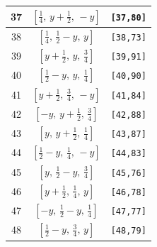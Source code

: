 \documentclass[fleqn,8pt]{jsarticle}
\begin{document}
\begin{longtable}{ccc}
37 & $\left[ \frac{1}{4},\, y + \frac{1}{2},\, - y \right]$ & {\tt [37,80]} \\ \hline
38 & $\left[ \frac{1}{4},\, \frac{1}{2} - y,\, y \right]$ & {\tt [38,73]} \\ \hline
39 & $\left[ y + \frac{1}{2},\, y,\, \frac{3}{4} \right]$ & {\tt [39,91]} \\ \hline
40 & $\left[ \frac{1}{2} - y,\, y,\, \frac{1}{4} \right]$ & {\tt [40,90]} \\ \hline
41 & $\left[ y + \frac{1}{2},\, \frac{3}{4},\, - y \right]$ & {\tt [41,84]} \\ \hline
42 & $\left[ - y,\, y + \frac{1}{2},\, \frac{3}{4} \right]$ & {\tt [42,88]} \\ \hline
43 & $\left[ y,\, y + \frac{1}{2},\, \frac{1}{4} \right]$ & {\tt [43,87]} \\ \hline
44 & $\left[ \frac{1}{2} - y,\, \frac{1}{4},\, - y \right]$ & {\tt [44,83]} \\ \hline
45 & $\left[ y,\, \frac{1}{2} - y,\, \frac{3}{4} \right]$ & {\tt [45,76]} \\ \hline
46 & $\left[ y + \frac{1}{2},\, \frac{1}{4},\, y \right]$ & {\tt [46,78]} \\ \hline
47 & $\left[ - y,\, \frac{1}{2} - y,\, \frac{1}{4} \right]$ & {\tt [47,77]} \\ \hline
48 & $\left[ \frac{1}{2} - y,\, \frac{3}{4},\, y \right]$ & {\tt [48,79]} \\
\end{longtable}
\renewcommand{\arraystretch}{1.2}
\end{document}
